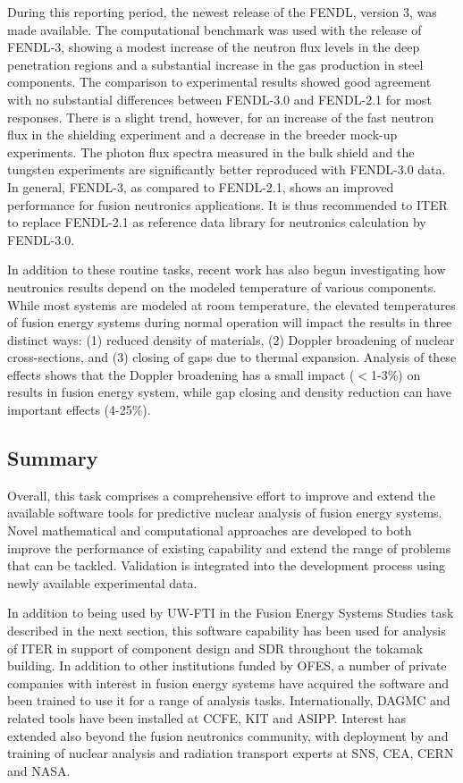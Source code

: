 During this reporting period, the newest release of the \gls{FENDL}, version
3, was made available.  The computational benchmark was used with the
release of \gls{FENDL}-3, showing a modest increase of the neutron flux levels
in the deep penetration regions and a substantial increase in the gas
production in steel components.  The comparison to experimental results showed
good agreement with no substantial differences between FENDL-3.0 and FENDL-2.1
for most responses.  There is a slight trend, however, for an increase of the
fast neutron flux in the shielding experiment and a decrease in the breeder
mock-up experiments. The photon flux spectra measured in the bulk shield and
the tungsten experiments are significantly better reproduced with FENDL-3.0
data. In general, FENDL-3, as compared to FENDL-2.1, shows an improved
performance for fusion neutronics applications. It is thus recommended to ITER
to replace FENDL-2.1 as reference data library for neutronics calculation by
FENDL-3.0.\cite{fischer_benchmarking_2014, bohm_impact_2015}

In addition to these routine tasks, recent work has also begun investigating
how neutronics results depend on the modeled temperature of various
components.  While most systems are modeled at room temperature, the elevated
temperatures of fusion energy systems during normal operation will impact the
results in three distinct ways: (1) reduced density of materials, (2) Doppler
broadening of nuclear cross-sections, and (3) closing of gaps due to thermal
expansion.  Analysis of these effects shows that the Doppler broadening has a
small impact ($<$1-3\%) on results in fusion energy system, while gap closing
and density reduction can have important effects (4-25\%).

\subsection{Summary}

Overall, this task comprises a comprehensive effort to improve and extend the
available software tools for predictive nuclear analysis of fusion energy
systems.  Novel mathematical and computational approaches are developed to
both improve the performance of existing capability and extend the range of
problems that can be tackled.  Validation is integrated into the development
process using newly available experimental data.

In addition to being used by \gls{UW-FTI} in the Fusion Energy Systems Studies
task described in the next section, this software capability has been used for
analysis of ITER in support of component design and \gls{SDR} throughout the
tokamak building.  In addition to other institutions funded by OFES, a number
of private companies with interest in fusion energy systems have acquired the
software and been trained to use it for a range of analysis tasks.
Internationally, \gls{DAGMC} and related tools have been installed at CCFE,
KIT and ASIPP.  Interest has extended also beyond the fusion neutronics
community, with deployment by and training of nuclear analysis and radiation
transport experts at \gls{SNS}, CEA, CERN and NASA.

